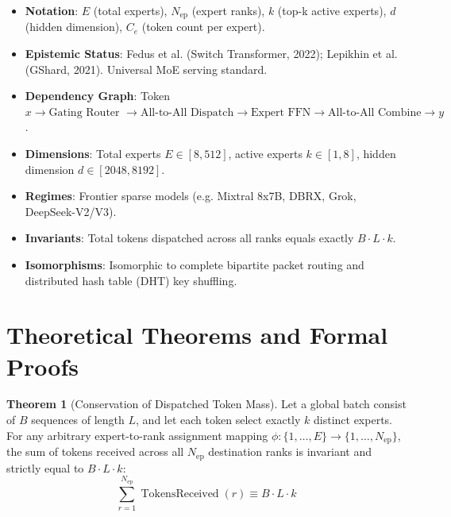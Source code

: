 \documentclass[11pt,a4paper]{article}
\theoremstyle{definition}
\newtheorem{theorem}{\textbf{Theorem}}[section]
\begin{document}
\begin{itemize}
    \item \textbf{Notation}: $E$ (total experts), $N_{\text{ep}}$ (expert ranks), $k$ (top-k active experts), $d$ (hidden dimension), $C_e$ (token count per expert).
    \item \textbf{Epistemic Status}: Fedus et al. (Switch Transformer, 2022); Lepikhin et al. (GShard, 2021). Universal MoE serving standard.
    \item \textbf{Dependency Graph}: Token $x \to \text{Gating Router } \to \text{All-to-All Dispatch} \to \text{Expert FFN} \to \text{All-to-All Combine} \to y$.
    \item \textbf{Dimensions}: Total experts $E \in [8, 512]$, active experts $k \in [1, 8]$, hidden dimension $d \in [2048, 8192]$.
    \item \textbf{Regimes}: Frontier sparse models (e.g. Mixtral 8x7B, DBRX, Grok, DeepSeek-V2/V3).
    \item \textbf{Invariants}: Total tokens dispatched across all ranks equals exactly $B \cdot L \cdot k$.
    \item \textbf{Isomorphisms}: Isomorphic to complete bipartite packet routing and distributed hash table (DHT) key shuffling.
\end{itemize}

\section{Theoretical Theorems and Formal Proofs}

\begin{theorem}[Conservation of Dispatched Token Mass]
Let a global batch consist of $B$ sequences of length $L$, and let each token select exactly $k$ distinct experts. For any arbitrary expert-to-rank assignment mapping $\phi: \{1, \dots, E\} \to \{1, \dots, N_{\text{ep}}\}$, the sum of tokens received across all $N_{\text{ep}}$ destination ranks is invariant and strictly equal to $B \cdot L \cdot k$:
{\boldmath
\begin{equation}
\sum_{r=1}^{N_{\text{ep}}} \operatorname{TokensReceived}(r) \equiv B \cdot L \cdot k
\end{equation}
}
\end{theorem}
\end{document}
